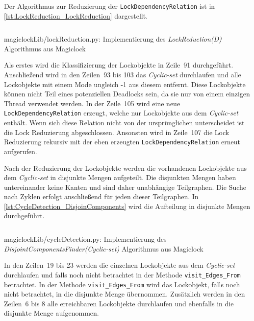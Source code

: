 Der Algorithmus zur Reduzierung der \texttt{Lock\-Dependency\-Relation} ist in
\cref{lst:LockReduction_LockReduction} dargestellt.
\begin{listing}[ht]
  \inputminted[frame=lines,linenos,firstline=90]{python}{./Python/magiclockLib/lockReduction.py}
  \caption{magiclockLib/lockReduction.py: Implementierung des \emph{LockReduction(D)} Algorithmus aus Magiclock\autocite[5]{MagicLock}}
  \label{lst:LockReduction_LockReduction}
\end{listing}
Als erstes wird die Klassifizierung der Lockobjekte in Zeile~91 durchgeführt.
Anschließend wird in den Zeilen~93 bis 103 das \emph{Cyclic-set} durchlaufen und
alle Lockobjekte mit einem Mode ungleich -1 aus diesem entfernt. Diese
Lockobjekte können nicht Teil eines potenziellen Deadlocks sein, da sie nur von
einem einzigen Thread verwendet werden. In der Zeile~105 wird eine neue
\texttt{Lock\-Dependency\-Relation} erzeugt, welche nur Lockobjekte aus dem
\emph{Cyclic-set} enthält. Wenn sich diese Relation nicht von der ursprünglichen
unterscheidet ist die Lock Reduzierung abgeschlossen. Ansonsten wird in
Zeile~107 die Lock Reduzierung rekursiv mit der eben erzeugten
\texttt{Lock\-Dependency\-Relation} erneut aufgerufen.

Nach der Reduzierung der Lockobjekte werden die vorhandenen Lockobjekte aus dem
\emph{Cyclic-set} in disjunkte Mengen aufgeteilt. Die disjunkten Mengen haben
untereinander keine Kanten und sind daher unabhängige Teilgraphen. Die Suche
nach Zyklen erfolgt anschließend für jeden dieser Teilgraphen. In
\cref{lst:CycleDetection_DisjoinComponents} wird die Aufteilung in disjunkte
Mengen durchgeführt. 
\begin{listing}[ht]
  \inputminted[frame=lines,linenos,firstline=1,lastline=25]{python}{./Python/magiclockLib/cycleDetection.py}
  \caption{magiclockLib/cycleDetection.py: Implementierung des \emph{Disjoint\-Components\-Finder\-(Cyclic-set)} Algorithmus aus Magiclock\autocite[8]{MagicLock}}
  \label{lst:CycleDetection_DisjoinComponents}
\end{listing}
In den Zeilen~19 bis 23 werden die einzelnen Lockobjekte aus dem
\emph{Cyclic-set} durchlaufen und falls noch nicht betrachtet in der Methode
\texttt{visit\_Edges\_From} betrachtet. In der Methode \texttt{visit\_Edges\_From}
wird das Lockobjekt, falls noch nicht betrachtet, in die disjunkte Menge
übernommen. Zusätzlich werden in den Zeilen~6 bis 8 alle erreichbaren
Lockobjekte durchlaufen und ebenfalls in die disjunkte Menge aufgenommen.

